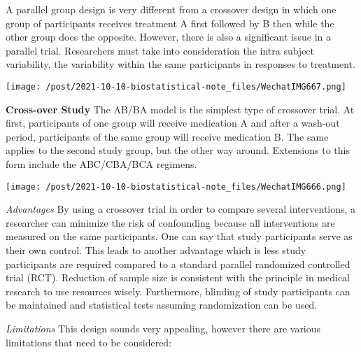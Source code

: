 \documentclass[
]{ctexart}
\begin{document}
A parallel group design is very different from a crossover design in
which one group of participants receives treatment A first followed by B
then while the other group does the opposite. However, there is also a
significant issue in a parallel trial. Researchers must take into
consideration the intra subject variability, the variability within the
same participants in responses to treatment.

\texttt{[image: /post/2021-10-10-biostatistical-note\_files/WechatIMG667.png]}

\textbf{Cross-over Study} The AB/BA model is the simplest type of
crossover trial. At first, participants of one group will receive
medication A and after a wash-out period, participants of the same group
will receive medication B. The same applies to the second study group,
but the other way around. Extensions to this form include the
ABC/CBA/BCA regimens.

\texttt{[image: /post/2021-10-10-biostatistical-note\_files/WechatIMG666.png]}

\emph{Advantages} By using a crossover trial in order to compare several
interventions, a researcher can minimize the risk of confounding because
all interventions are measured on the same participants. One can say
that study participants serve as their own control. This leads to
another advantage which is less study participants are required compared
to a standard parallel randomized controlled trial (RCT). Reduction of
sample size is consistent with the principle in medical research to use
resources wisely. Furthermore, blinding of study participants can be
maintained and statistical tests assuming randomization can be used.

\emph{Limitations} This design sounds very appealing, however there are
various limitations that need to be considered:
\end{document}
